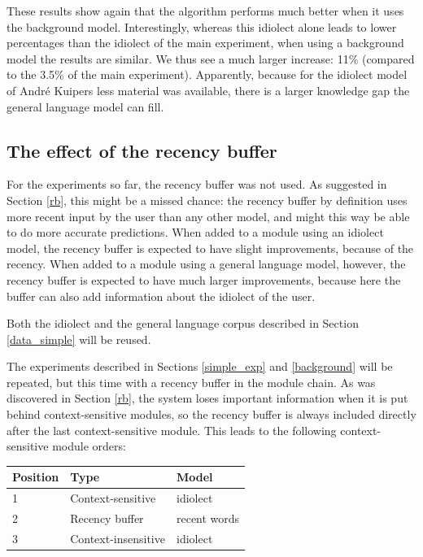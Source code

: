 \documentclass[11pt]{article}
\let\originaltable\table
\let\endoriginaltable\endtable
\renewenvironment{table}[1][ht]{%
  \originaltable[#1]
  \centering}%
  {\endoriginaltable}
\begin{document}
These results show again that the algorithm performs much better when it uses the background model. Interestingly, whereas this idiolect alone leads to lower percentages than the idiolect of the main experiment, when using a background model the results are similar. We thus see a much larger increase: 11\% (compared to the 3.5\% of the main experiment). Apparently, because for the idiolect model of Andr\'e Kuipers less material was available, there is a larger knowledge gap the general language model can fill.


\subsection{The effect of the recency buffer} \label{recbuf}

For the experiments so far, the recency buffer was not used. As suggested in Section \ref{rb}, this might be a missed chance: the recency buffer by definition uses more recent input by the user than any other model, and might this way be able to do more accurate predictions. When added to a module using an idiolect model, the recency buffer is expected to have slight improvements, because of the recency. When added to a module using a general language model, however, the recency buffer is expected to have much larger improvements, because here the buffer can also add information about the idiolect of the user.

Both the idiolect and the general language corpus described in Section \ref{data_simple} will be reused. 

The experiments described in Sections \ref{simple_exp} and \ref{background} will be repeated, but this time with a recency buffer in the module chain. As was discovered in Section \ref{rb}, the system loses important information when it is put behind context-sensitive modules, so the recency buffer is always included directly after the last context-sensitive module. This leads to the following context-sensitive module orders:

\begin{table}[H]
\begin{tabular}{lll} 
Position&Type&Model\\
\hline
1&Context-sensitive&idiolect\\
2&Recency buffer&recent words\\
3&Context-insensitive&idiolect\\
\end{tabular} 
\caption{The module order for simulation 1, with the idiolect model and the recency buffer} 
\end{table}
\end{document}
